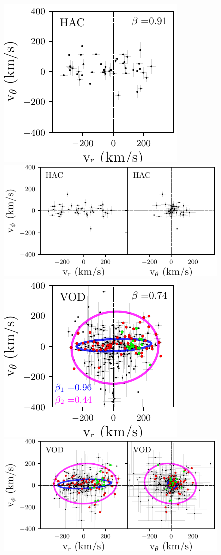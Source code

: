 \documentclass[fleqn,usenatbib]{mnras}
\begin{document}
\begin{figure}
	\includegraphics[scale=0.53]{HAC_velocities_vphi.pdf}
    \includegraphics[scale=0.53]{HAC_velocities_vtheta.pdf} \\
  \includegraphics[scale=0.53]{VOD_velocities_vphi.pdf}
    \includegraphics[scale=0.53]{VOD_velocities_vtheta.pdf}  

\end{figure}
\end{document}
